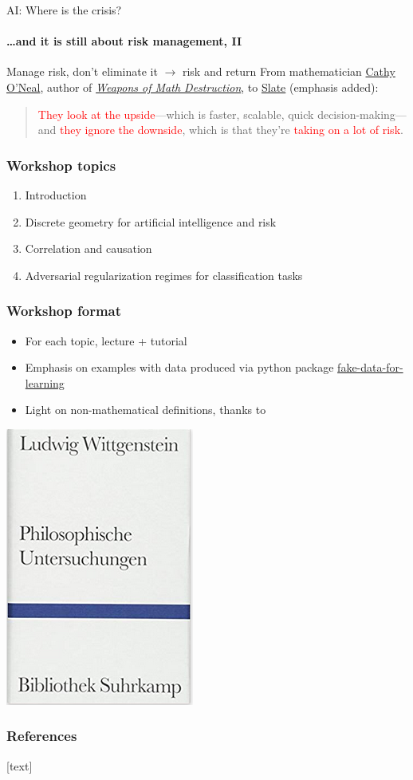\begin{frame}{AI: Where is the crisis?}
  \framesubtitle{\ldots and it is still about risk management, II}
  {\large Manage risk, don't eliminate it $\rightarrow$ risk and return}
  \newline
  \newline
  From mathematician \href{https://mathbabe.org/}{Cathy O'Neal}, author of \href{https://en.wikipedia.org/wiki/Weapons_of_Math_Destruction}{\textit{Weapons of Math Destruction}}, to \href{https://slate.com/business/2019/11/apple-card-credit-algorithm-bias-discrimination-women.html}{Slate} (emphasis added):
  \begin{quotation}
    \noindent \textcolor{red}{They look at the upside}—which is faster, scalable, quick decision-making—and \textcolor{red}{they ignore the downside}, which is that they're \textcolor{red}{taking on a lot of risk}.
  \end{quotation}

\end{frame}


\begin{frame}
\frametitle{Workshop topics}
\begin{enumerate}
\item Introduction
\item Discrete geometry for artificial intelligence and risk
\item Correlation and causation
\item Adversarial regularization regimes for classification tasks
\end{enumerate}
\end{frame}

\begin{frame}
\frametitle{Workshop format}

\begin{itemize}
\item For each topic, lecture + tutorial
\item Emphasis on examples with data produced via python package \href{https://munichpavel.github.io/fake-data-for-learning/}{fake-data-for-learning}
\item Light on non-mathematical definitions, thanks to
\end{itemize}
\centering
\includegraphics[width=0.3\textheight]{graphics/pi_wittgenstein}
\end{frame}

\begin{frame}[allowframebreaks]
  \frametitle{References}
  [text]
  
  
\end{frame}



